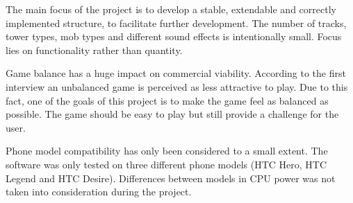 The main focus of the project is to develop a stable, extendable and correctly implemented structure, to facilitate further development. The number of tracks, tower types, mob types and different sound effects is intentionally small. Focus lies on functionality rather than quantity.

Game balance has a huge impact on commercial viability. According to the first interview an unbalanced game is perceived as less attractive to play. Due to this fact, one of the goals of this project is to make the game feel as balanced as possible. The game should be easy to play but still provide a challenge for the user.

Phone model compatibility has only been considered to a small extent. The software was only tested on three different phone models (HTC Hero, HTC Legend and HTC Desire). Differences between models in CPU power was not taken into consideration during the project.